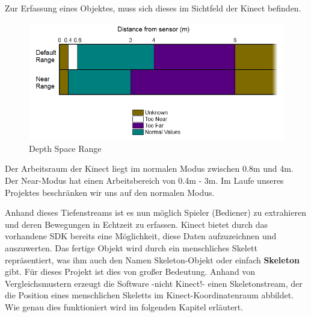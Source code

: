 Zur Erfassung eines Objektes, muss sich dieses im Sichtfeld der Kinect befinden. 
\begin{figure}[H]						
	\centering							
	\includegraphics[scale=0.7]{Bilder/kinect_range.png}			
	\caption{Depth Space Range \cite{ws:microsoft_coordinateSpaces}}						
	\label{f:kinect_range}						
\end{figure}

Der Arbeitsraum der Kinect liegt im normalen Modus zwischen 0.8m und 4m. Der Near-Modus hat einen Arbeitsbereich von 0.4m - 3m. Im Laufe unseres Projektes beschränken wir uns auf den normalen Modus.

Anhand dieses Tiefenstreams ist es nun möglich Spieler (Bediener) zu extrahieren und deren Bewegungen
in Echtzeit zu erfassen. Kinect bietet durch das vorhandene SDK bereits eine Möglichkeit, diese Daten aufzuzeichnen und auszuwerten. Das fertige Objekt wird durch ein menschliches Skelett repräsentiert, was ihm auch den Namen Skeleton-Objekt oder einfach \textbf{Skeleton} gibt. Für dieses Projekt ist dies von großer Bedeutung. Anhand von Vergleichsmustern erzeugt die Software -nicht Kinect!- einen Skeletonstream, der die Position eines menschlichen Skeletts im Kinect-Koordinatenraum abbildet.\cite{SWB-376536934}
Wie genau dies funktioniert wird im folgenden Kapitel erläutert.



%
%

